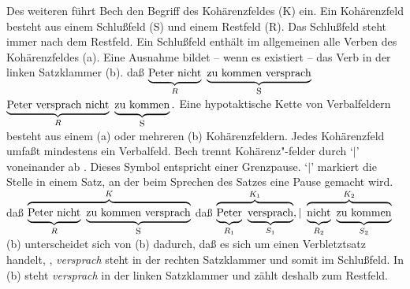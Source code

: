 Des weiteren führt Bech den Begriff des Kohärenzfeldes (K) ein.%
Ein Kohärenzfeld besteht aus einem Schlußfeld (S) und einem Restfeld (R).%
%
%
%
Das Schlußfeld steht immer nach dem Restfeld. Ein Schlußfeld enthält im allgemeinen
alle Verben des Kohärenzfeldes (a). Eine Ausnahme bildet -- wenn es existiert --
das Verb in der linken Satzklammer (b).
\eal
\ex daß ${\underbrace{\rule[-0.5ex]{0cm}{2.5ex}\mbox{Peter nicht}
                              }_{R}~
                   \underbrace{\mbox{zu kommen versprach}
                              }_{\mbox{\footnotesize S}}}$
\ex ${ \underbrace{\mbox{Peter versprach nicht}
                        }_{R}~
             \underbrace{\rule[-0.5ex]{0cm}{2.5ex}\mbox{zu kommen}
                        }_{\mbox{\footnotesize S}}.}$
\zl
Eine hypotaktische Kette von Verbalfeldern besteht aus einem (a) oder mehreren
(b) Kohärenzfeldern. Jedes Kohärenzfeld umfaßt mindestens ein Verbalfeld. Bech trennt
Kohä\-renz"-felder durch `$|$'\is{$\vert$} voneinander ab \citep[\S 77]{Bech55a}. 
%
%
Dieses Symbol entspricht einer Grenzpause.
`$|$' markiert die Stelle in einem Satz, an der beim Sprechen des Satzes 
eine Pause gemacht wird.
\eal
\ex daß ${\overbrace{\underbrace{\rule[-0.5ex]{0cm}{2.5ex}{\textrm{Peter~nicht}}
                                         }_{R}~
                   \underbrace{\textrm{zu~kommen~versprach}}_{\mbox{\footnotesize S}}}^{K}}$
%
\ex daß ${\overbrace{\underbrace{\rule[-0.5ex]{0cm}{2.5ex}{\textrm{Peter}}
                                         }_{R_1}~
                              \underbrace{\textrm{versprach}}_{S_1}
                             }^{K_1}, |~
                   \overbrace{\underbrace{\rule[-0.5ex]{0cm}{2.5ex}{\textrm{nicht}}
                                         }_{R_2}~
                              \underbrace{\rule[-0.5ex]{0cm}{2.5ex}{\textrm{zu~kommen}}
                                         }_{S_2}
                             }^{K_2}}$
\zl
(b) unterscheidet sich von (b) dadurch, daß es sich um
einen Verbletztsatz handelt, \dash, \emph{versprach} steht in der rechten Satzklammer und somit im
Schlußfeld. In (b) steht \emph{versprach} in der linken Satzklammer und zählt deshalb zum
Restfeld. 

